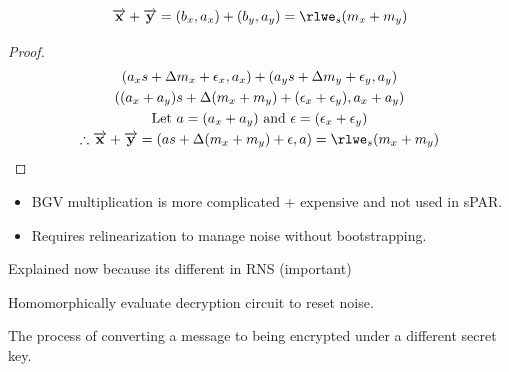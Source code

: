 \begin{definition}
    \begin{equation}
        \vec{x} + \vec{y} = (b_x, a_x) + (b_y, a_y) = \rlwe_s(m_x + m_y)
    \end{equation}
    \begin{proof}
        \begin{gather*}
            (a_x s + \Delta m_x + \epsilon_x, a_x) + (a_y s + \Delta m_y + \epsilon_y, a_y) \\
            ((a_x +a_y )s + \Delta (m_x+m_y) + (\epsilon_x + \epsilon_y), a_x + a_y) \\
            \text{Let } a = (a_x + a_y) \text{ and } \epsilon = (\epsilon_x + \epsilon_y)\\
            \therefore \vec{x} + \vec{y} = (as + \Delta(m_x + m_y) + \epsilon, a) = \rlwe_s(m_x + m_y)
        \end{gather*}
    \end{proof}
\end{definition}

\begin{itemize}
    \item BGV multiplication is more complicated + expensive and not used in sPAR. 
    \item Requires relinearization to manage noise without bootstrapping.
\end{itemize}

\begin{definition}
    Explained now because its different in RNS (important)
\end{definition}

\begin{definition}[Boostrapping]
    Homomorphically evaluate decryption circuit to reset noise.
\end{definition}

\begin{definition}[Keyswitching]
    The process of converting a message to being encrypted under a different secret key.
\end{definition}

\newpage